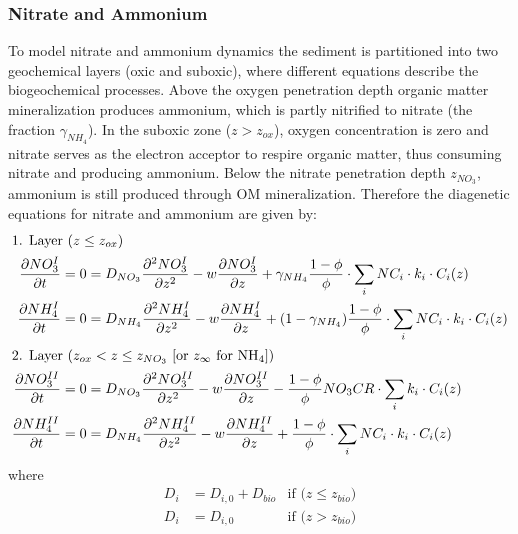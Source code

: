 \documentclass[gmd, manuscript]{copernicus}
\begin{document}
\subsubsection{Nitrate and Ammonium}
To model nitrate and ammonium dynamics the sediment is partitioned into two geochemical layers (oxic and suboxic), where different equations describe the biogeochemical processes. 
Above the oxygen penetration depth organic matter mineralization produces ammonium, which is partly nitrified to nitrate (the fraction $\gamma_{NH_4}$). 
In the suboxic zone ($z>z_{ox}$), oxygen concentration is zero and nitrate serves as the electron acceptor to respire organic matter, thus consuming nitrate and producing ammonium. Below the nitrate 
penetration depth $z_{NO_3}$, ammonium is still produced through OM mineralization. Therefore the diagenetic equations for nitrate and ammonium are given by:
\begin{align}
\intertext{1. Layer ($z \leq z_{ox}$)}
 \frac{\partial NO_3^I}{\partial t} &= 0 = D_{NO_3} \frac{\partial^2NO_3^I }{\partial z^2} - w\frac{\partial NO_3^I }{\partial z} + \gamma_{NH_4} \frac{1-\phi}{\phi} \cdot \sum_i NC_i \cdot k_i \cdot C_{i}(z)\label{eq:NO3_ODE1_L1}\\ %
 \frac{\partial NH_4^I}{\partial t} &= 0 = D_{NH_4} \frac{\partial^2NH_4^I }{\partial z^2} - w\frac{\partial NH_4^I }{\partial z} + (1-\gamma_{NH_4}) \frac{1-\phi}{\phi} \cdot \sum_i NC_i \cdot k_i \cdot C_{i}(z)\label{eq:NH4_ODE1_L1}\\
 \intertext{2. Layer ($z_{ox} < z \leq z_{NO_3}$ [or $z_\infty$ for NH$_4$])} 
\frac{\partial NO_3^{II}}{\partial t} &= 0 = D_{NO_3} \frac{\partial^2NO_3^{II} }{\partial z^2} - w\frac{\partial NO_3^{II} }{\partial z} - \frac{1-\phi}{\phi} NO_3CR \cdot \sum_i k_i \cdot C_{i}(z) \label{eq:NO3_ODE1_L2}\\
\frac{\partial NH_4^{II}}{\partial t} &= 0 = D_{NH_4} \frac{\partial^2NH_4^{II} }{\partial z^2} - w\frac{\partial NH_4^{II} }{\partial z} + \frac{1-\phi}{\phi} \cdot \sum_i NC_i \cdot k_i \cdot C_{i}(z)\label{eq:NH4_ODE1_L2}
\end{align}
where
\begin{align}
 D_{i}&=D_{i, 0}+D_{bio} &\text{if ($z\leq z_{bio}$)}\\
 D_{i}&=D_{i, 0}                &\text{if ($z > z_{bio}$)} 
\end{align} 
\end{document}
